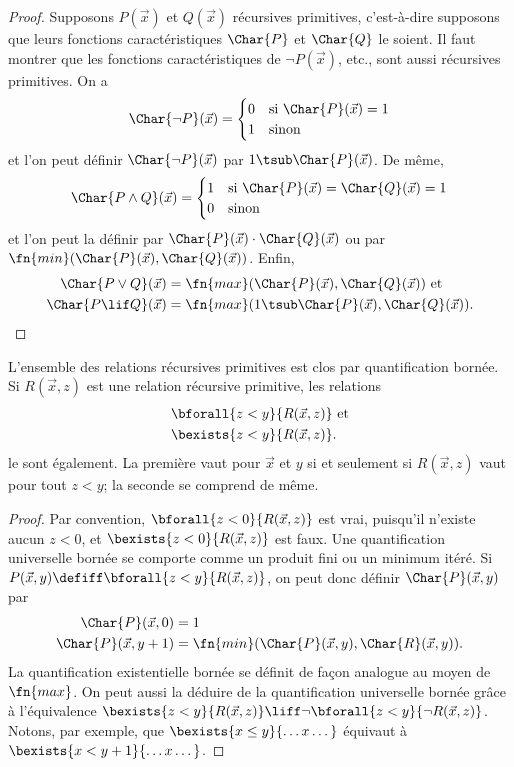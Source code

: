 \documentclass[../../../include/open-logic-section]{subfiles}
\begin{document}
\begin{proof}
  Supposons $P(\vec x)$ et $Q(\vec x)$ récursives
  primitives, c'est-à-dire supposons que leurs fonctions
  caractéristiques $\Char{P}$ et $\Char{Q}$ le soient.
  Il faut montrer que les fonctions caractéristiques
  de $\lnot P(\vec x)$, etc., sont aussi récursives
  primitives. On a
  \[
  \Char{\lnot P}(\vec x) = \begin{cases}
    0 & \text{si $\Char{P}(\vec x)=1$}\\
    1 & \text{sinon}
  \end{cases}
  \]
  et l'on peut définir $\Char{\lnot P}(\vec x)$ par
  $1\tsub\Char{P}(\vec x)$. De même,
  \[
  \Char{P\land Q}(\vec x) = \begin{cases}
    1 & \text{si $\Char{P}(\vec x)=\Char{Q}(\vec x)=1$}\\
    0 & \text{sinon}
  \end{cases}
  \]
  et l'on peut la définir par
  $\Char{P}(\vec x)\cdot\Char{Q}(\vec x)$ ou par
  $\fn{min}(\Char{P}(\vec x),\Char{Q}(\vec x))$.
  Enfin,
  \begin{align*}
    \Char{P \lor Q}(\vec x) & = \fn{max}(\Char{P}(\vec x), \Char{Q}(\vec x)) \text{ et}\\
    \Char{P \lif Q}(\vec x) & = \fn{max}(1 \tsub
  \Char{P}(\vec x), \Char{Q}(\vec x)).
  \end{align*}
\end{proof}

\begin{prop}
  L'ensemble des relations récursives primitives est clos
  par quantification bornée. Si $R(\vec x,z)$ est une
  relation récursive primitive, les relations
  \begin{align*}
    & \bforall{z < y}{R(\vec x, z)} \text{ et}\\
    & \bexists{z < y}{R(\vec x, z)}.
  \end{align*}
  le sont également. La première vaut pour $\vec x$ et
  $y$ si et seulement si $R(\vec x,z)$ vaut pour tout
  $z<y$; la seconde se comprend de même.
\end{prop}

\begin{proof}
  Par convention, $\bforall{z < 0}{R(\vec x,z)}$ est
  vrai, puisqu'il n'existe aucun $z<0$, et
  $\bexists{z < 0}{R(\vec x,z)}$ est faux. Une
  quantification universelle bornée se comporte comme
  un produit fini ou un minimum itéré. Si
  $P(\vec x,y)\defiff\bforall{z < y}{R(\vec x,z)}$,
  on peut donc définir $\Char{P}(\vec x,y)$ par
  \begin{align*}
    \Char{P}(\vec x, 0) & = 1\\
    \Char{P}(\vec x, y+1) & =
    \fn{min}(\Char{P}(\vec x,y),\Char{R}(\vec x,y)).
  \end{align*}
  La quantification existentielle bornée se définit de
  façon analogue au moyen de~$\fn{max}$. On peut aussi
  la déduire de la quantification universelle bornée
  grâce à l'équivalence
  $\bexists{z < y}{R(\vec x,z)}
  \liff\lnot\bforall{z < y}{\lnot R(\vec x,z)}$.
  Notons, par exemple, que
  $\bexists{x \leq y}{\dots x\dots}$
  équivaut à $\bexists{x < y+1}{\dots x\dots}$.
\end{proof}
\end{document}
